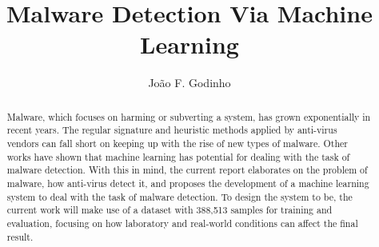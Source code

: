 \documentclass{llncs}
\begin{document}
\frontmatter

\title{Malware Detection Via Machine Learning}
\subtitle{}
\author{João F. Godinho}
\let\oldaddcontentsline\addcontentsline
\def\addcontentsline#1#2#3{}
\maketitle
\def\addcontentsline#1#2#3{\oldaddcontentsline{#1}{#2}{#3}}


\begin{abstract}
	Malware, which focuses on harming or subverting a system, has grown exponentially in recent years. The regular signature and heuristic methods applied by anti-virus vendors can fall short on keeping up with the rise of new types of malware. Other works have shown that machine learning has potential for dealing with the task of malware detection. With this in mind, the current report elaborates on the problem of malware, how anti-virus detect it, and proposes the development of a machine learning system to deal with the task of malware detection. To design the system to be, the current work will make use of a dataset with 388,513 samples for training and evaluation, focusing on how laboratory and real-world conditions can affect the final result.
\end{abstract}


\setcounter{tocdepth}{2}
\tableofcontents
\end{document}
